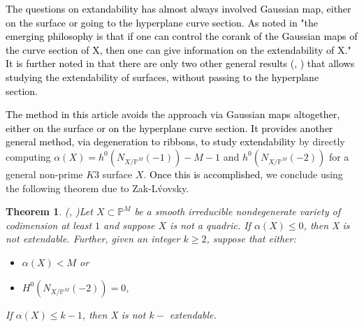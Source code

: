 \documentclass[11pt,twoside]{amsart}
\theoremstyle{plain}
\numberwithin{equation}{section}
\newtheorem{theorem}{Theorem}[section]
\theoremstyle{definition}
\begin{document}
\smallskip

\textcolor{black}{The questions on extandability has almost always involved Gaussian map, either on the surface or going to the hyperplane curve section. As noted in \cite{Lop23} "the emerging philosophy is that if one can control the corank of the Gaussian maps of the curve section of X, then one can give information on the extendability of X." It is further noted in \cite{Lop23} that there \textcolor{black}{are} only \textcolor{black}{two} other general results (\cite{KLM11}, \cite{CDGK20}) that allows studying the extendability of surfaces, without passing to the hyperplane section.}\

\smallskip

 \textcolor{black}{The method in this article  avoids the approach via Gaussian maps altogether, either on the surface or on the hyperplane curve section. It provides another general method, via degeneration to ribbons, to study extendability} by directly computing $\alpha(X) = h^0(N_{X/\mathbb{P}^M}(-1))-M-1$ and $h^0(N_{X/\mathbb{P}^M}(-2))$ for a general non-prime $K3$ surface $X$. \textcolor{black}{Once this is accomplished,} we conclude using the following theorem due to Zak-L\'vovsky. 

\begin{theorem}(\cite{Lvo92}, \cite{Zak91})\label{ZL}
Let $X \subset \mathbb{P}^{M}$ be a smooth irreducible nondegenerate variety of codimension at least $1$ and suppose $X$ is not a quadric. If $\alpha(X) \leq 0$, then X is not extendable. Further, given an integer $k \geq 2$, suppose that either:
\begin{itemize}
    \item[(1)] $\alpha(X) < M$ or
    \item[(2)] $H^0(N_{X/\mathbb{P}^M}(-2)) = 0$,
\end{itemize}
If $\alpha(X) \leq k-1$, then X is not $k-$ extendable.  

\end{theorem}
\end{document}
